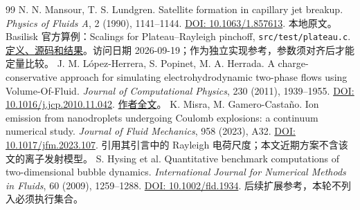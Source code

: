 \documentclass[11pt,a4paper]{article}
\newcommand{\code}[1]{{\small\nolinkurl{#1}}}
\newcommand{\doi}[1]{\href{https://doi.org/#1}{DOI: #1}}
\begin{document}
\begin{thebibliography}{99}
 N. N. Mansour, T. S. Lundgren. Satellite formation in capillary jet breakup. \emph{Physics of Fluids A}, 2 (1990), 1141--1144. \doi{10.1063/1.857613}. 本地原文。
 Basilisk 官方算例：Scalings for Plateau--Rayleigh pinchoff, \code{src/test/plateau.c}. \href{https://basilisk.fr/src/test/plateau.c}{定义、源码和结果}。访问日期 2026-09-19；作为独立实现参考，参数须对齐后才能定量比较。
 J. M. López-Herrera, S. Popinet, M. A. Herrada. A charge-conservative approach for simulating electrohydrodynamic two-phase flows using Volume-Of-Fluid. \emph{Journal of Computational Physics}, 230 (2011), 1939--1955. \doi{10.1016/j.jcp.2010.11.042}. \href{https://gerris.dalembert.upmc.fr/papers/ehd.pdf}{作者全文}。
 K. Misra, M. Gamero-Castaño. Ion emission from nanodroplets undergoing Coulomb explosions: a continuum numerical study. \emph{Journal of Fluid Mechanics}, 958 (2023), A32. \doi{10.1017/jfm.2023.107}. 引用其引言中的 Rayleigh 电荷尺度；本文近期方案不含该文的离子发射模型。
 S. Hysing et al. Quantitative benchmark computations of two-dimensional bubble dynamics. \emph{International Journal for Numerical Methods in Fluids}, 60 (2009), 1259--1288. \doi{10.1002/fld.1934}. 后续扩展参考，本轮不列入必须执行集合。
\end{thebibliography}
\end{document}
